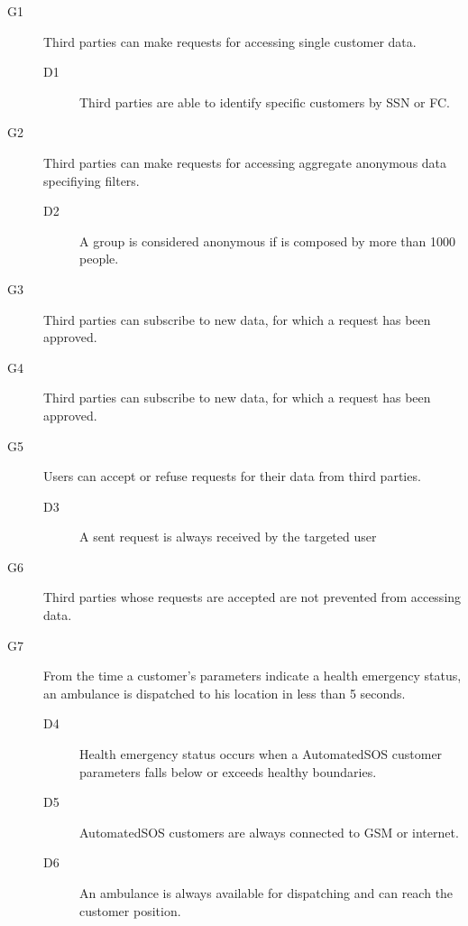 \documentclass[../main.tex]{subfiles}
\begin{document}
\begin{description}

	\item [G1] Third parties can make requests for accessing single customer data.
	\begin{description}
		\item [D1] Third parties are able to identify specific customers by SSN or FC.
	\end{description}

	\item [G2] Third parties can make requests for accessing aggregate anonymous data specifiying filters.
	\begin{description}
		\item [D2] A group is considered anonymous if is composed by more than 1000 people.
	\end{description}

	\item [G3] Third parties can subscribe to new data, for which a request has been approved.
	\begin{description}
		\item %
	\end{description}

	\item [G4] Third parties can subscribe to new data, for which a request has been approved.
	\begin{description}
		\item
	\end{description}

	\item [G5]  Users can accept or refuse requests for their data from third parties.
	\begin{description}
		\item [D3]  A sent request is always received by the targeted user
	\end{description}

	\item [G6]  Third parties whose requests are accepted are not prevented from accessing data.
	\begin{description}
		\item
	\end{description}

	\item [G7]  From the time a customer's parameters indicate a health emergency status, an ambulance is dispatched to his location in less than 5 seconds.
	\begin{description}
		\item [D4] Health emergency status occurs when a AutomatedSOS customer parameters falls below or exceeds healthy boundaries.
		\item [D5] AutomatedSOS customers are always connected to GSM or internet.
		\item [D6] An ambulance is always available for dispatching and can reach the customer position.
	\end{description}


\end{description}
\end{document}
